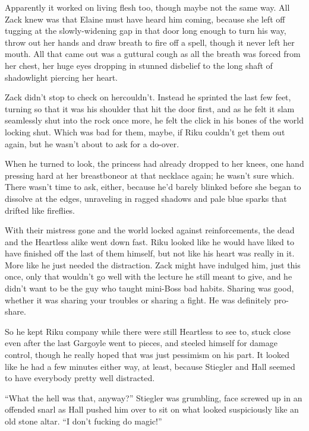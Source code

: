Apparently it worked on living flesh too, though maybe not the same way. All Zack knew was that Elaine must have heard him coming, because she left off tugging at the slowly-widening gap in that door long enough to turn his way, throw out her hands and draw breath to fire off a spell, though it never left her mouth. All that came out was a guttural cough as all the breath was forced from her chest, her huge eyes dropping in stunned disbelief to the long shaft of shadowlight piercing her heart.

Zack didn't stop to check on her\textemdash couldn't. Instead he sprinted the last few feet, turning so that it was his shoulder that hit the door first, and as he felt it slam seamlessly shut into the rock once more, he felt the click in his bones of the world locking shut. Which was bad for them, maybe, if Riku couldn't get them out again, but he wasn't about to ask for a do-over.

When he turned to look, the princess had already dropped to her knees, one hand pressing hard at her breastbone\textemdash or at that necklace again; he wasn't sure which. There wasn't time to ask, either, because he'd barely blinked before she began to dissolve at the edges, unraveling in ragged shadows and pale blue sparks that drifted like fireflies.

With their mistress gone and the world locked against reinforcements, the dead and the Heartless alike went down fast. Riku looked like he would have liked to have finished off the last of them himself, but not like his heart was really in it. More like he just needed the distraction. Zack might have indulged him, just this once, only that wouldn't go well with the lecture he still meant to give, and he didn't want to be the guy who taught mini-Boss bad habits. Sharing was good, whether it was sharing your troubles or sharing a fight. He was definitely pro-share.

So he kept Riku company while there were still Heartless to see to, stuck close even after the last Gargoyle went to pieces, and steeled himself for damage control, though he really hoped that was just pessimism on his part. It looked like he had a few minutes either way, at least, because Stiegler and Hall seemed to have everybody pretty well distracted.

``What the hell was that, anyway?'' Stiegler was grumbling, face screwed up in an offended snarl as Hall pushed him over to sit on what looked suspiciously like an old stone altar. ``I don't fucking do magic!''

